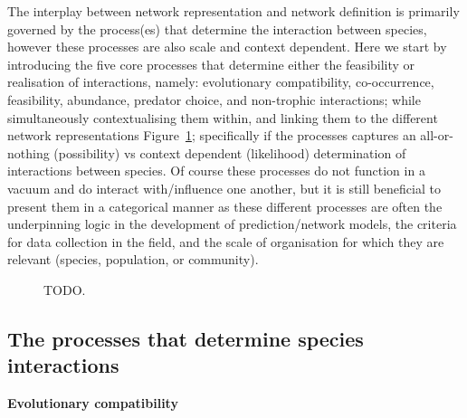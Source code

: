 \documentclass[
]{article}
\makeatletter
\newcommand*\pandocbounded[1]{%
  \sbox\pandoc@box{#1}%
  \Gscale@div\@tempa{\textheight}{\dimexpr\ht\pandoc@box+\dp\pandoc@box\relax}%
  \Gscale@div\@tempb{\linewidth}{\wd\pandoc@box}%
  \ifdim\@tempb\p@<\@tempa\p@\let\@tempa\@tempb\fi%
  \ifdim\@tempa\p@<\p@\scalebox{\@tempa}{\usebox\pandoc@box}%
  \else\usebox{\pandoc@box}%
  \fi%
}
\makeatother
\begin{document}
The interplay between network representation and network definition is
primarily governed by the process(es) that determine the interaction
between species, however these processes are also scale and context
dependent. Here we start by introducing the five core processes that
determine either the feasibility or realisation of interactions, namely:
evolutionary compatibility, co-occurrence, feasibility, abundance,
predator choice, and non-trophic interactions; while simultaneously
contextualising them within, and linking them to the different network
representations Figure~\ref{fig-process}; specifically if the processes
captures an all-or-nothing (possibility) vs context dependent
(likelihood) determination of interactions between species. Of course
these processes do not function in a vacuum and do interact
with/influence one another, but it is still beneficial to present them
in a categorical manner as these different processes are often the
underpinning logic in the development of prediction/network models, the
criteria for data collection in the field, and the scale of organisation
for which they are relevant (species, population, or community).

\begin{figure}

\centering{

\pandocbounded{\texttt{[image: images/concept\_v2.png]}}

}

\caption{\label{fig-process}TODO.}

\end{figure}%

\subsection{The processes that determine species
interactions}\label{the-processes-that-determine-species-interactions}

\textbf{Evolutionary compatibility}
\end{document}
